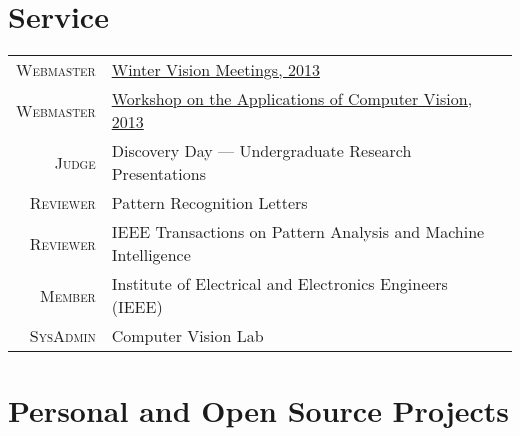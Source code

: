 \documentclass[10pt]{article}
\begin{document}
\section{Service}
\vspace{-1em}
\newcommand{\service}[2]{
  \textsc{#1} & #2\\
}
\begin{longtable}{r|p{10cm}}
  \service{Webmaster}{\href{http://cvl.cse.sc.edu/wvm2013/}{Winter Vision Meetings, 2013}}
  \service{Webmaster}{\href{http://cvl.cse.sc.edu/wacv2013/}{Workshop on the Applications of Computer Vision, 2013}}
  \service{Judge}{Discovery Day --- Undergraduate Research Presentations}
  \service{Reviewer}{Pattern Recognition Letters}
  \service{Reviewer}{IEEE Transactions on Pattern Analysis and Machine Intelligence}
  \service{Member}{Institute of Electrical and Electronics Engineers (IEEE)}
  \service{SysAdmin}{Computer Vision Lab}
\end{longtable}

\section{Personal and Open Source Projects}
\newcommand{\proj}[3]{
  \textsc{#1} & #2\\
   &\href{http://www.#3}{#3}\\
   \multicolumn{2}{c}{} \\ [-1ex]
}

\newcommand{\projlh}[4]{
  \textsc{#1} & #2\\
   &\href{#3}{#4}\\
}
\end{document}
